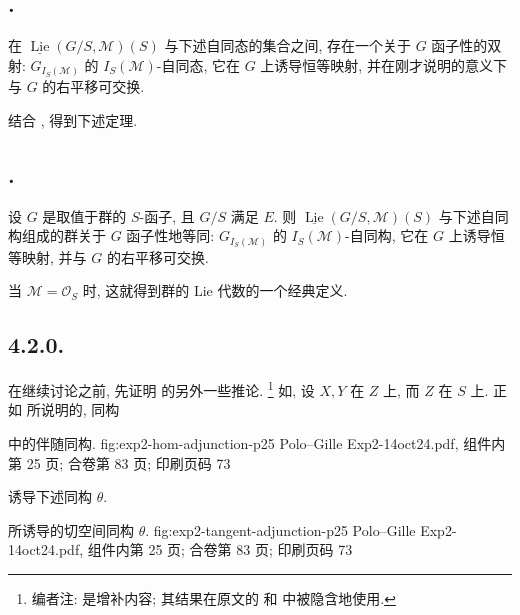 \subsection*{.}
在 \(\underline{\operatorname{Lie}}(G/S,\mathcal M)(S)\) 与下述自同态的集合之间,
存在一个关于 \(G\) 函子性的双射:
\(G_{I_S(\mathcal M)}\) 的 \(I_S(\mathcal M)\)-自同态,
它在 \(G\) 上诱导恒等映射, 并在刚才说明的意义下与 \(G\) 的右平移可交换.

结合 , 得到下述定理.

\subsection*{.}
设 \(G\) 是取值于群的 \(S\)-函子, 且 \(G/S\) 满足 \(E\).
则 \(\underline{\operatorname{Lie}}(G/S,\mathcal M)(S)\)
与下述自同构组成的群关于 \(G\) 函子性地等同:
\(G_{I_S(\mathcal M)}\) 的 \(I_S(\mathcal M)\)-自同构,
它在 \(G\) 上诱导恒等映射, 并与 \(G\) 的右平移可交换.

当 \(\mathcal M=\mathcal O_S\) 时, 这就得到群的 Lie 代数的一个经典定义.

\subsection*{4.2.0.}
在继续讨论之前, 先证明  的另外一些推论.
\footnote{编者注: 是增补内容;
其结果在原文的  和
 中被隐含地使用.}
如, 设 \(X,Y\) 在 \(Z\) 上,
而 \(Z\) 在 \(S\) 上. 正如  所说明的,
同构 

  { 中的伴随同构.}
  {fig:exp2-hom-adjunction-p25}
  {Polo--Gille Exp2-14oct24.pdf, 组件内第 25 页; 合卷第 83 页; 印刷页码 73}

诱导下述同构 \(\theta\).

  {所诱导的切空间同构 \(\theta\).}
  {fig:exp2-tangent-adjunction-p25}
  {Polo--Gille Exp2-14oct24.pdf, 组件内第 25 页; 合卷第 83 页; 印刷页码 73}


